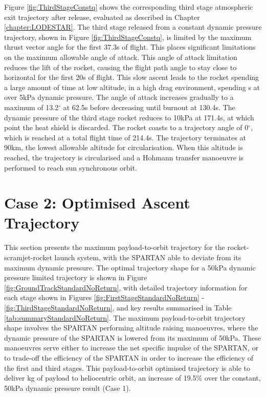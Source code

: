Figure \ref{fig:ThirdStageConstq} shows the corresponding third stage atmospheric exit trajectory after release, evaluated as described in Chapter \ref{chapter:LODESTAR}. The third stage released from a constant dynamic pressure trajectory, shown in Figure \ref{fig:ThirdStageConstq}, is limited by the maximum thrust vector angle for the first 37.3s of flight. This places significant limitations on the maximum allowable angle of attack. This angle of attack limitation reduces the lift of the rocket, causing the flight path angle to stay close to horizontal for the first 20s of flight. This slow ascent leads to the rocket spending a large amount of time at low altitude, in a high drag environment, spending \thirdqOverFiveConstqNoReturn s at over 5kPa dynamic pressure. The angle of attack increases gradually to a maximum of 13.2$^\circ$ at 62.5s before decreasing until burnout at 130.4s. The dynamic pressure of the third stage rocket reduces to 10kPa at 171.4s, at which point the heat shield is discarded. The rocket coasts to a trajectory angle of 0$^\circ$, which is reached at a total flight time of 214.4s. The trajectory terminates at 90km, the lowest allowable altitude for circularisation. 
When this altitude is reached, the trajectory is circularised and a Hohmann transfer manoeuvre is performed to reach sun synchronous orbit.






\section{Case 2: Optimised Ascent Trajectory}\label{sec:optimisednoreturn}


This section presents the maximum payload-to-orbit trajectory for the rocket-scramjet-rocket launch system, with the SPARTAN able to deviate from its maximum dynamic pressure. 
The optimal trajectory shape for a 50kPa dynamic pressure limited trajectory is shown in Figure \ref{fig:GroundTrackStandardNoReturn}, with detailed trajectory information for each stage shown in Figures \ref{fig:FirstStageStandardNoReturn} - \ref{fig:ThirdStageStandardNoReturn}, and key results summarised in Table \ref{tab:summaryStandardNoReturn}. The maximum payload-to-orbit trajectory shape involves the SPARTAN performing altitude raising manoeuvres, where the dynamic pressure of the SPARTAN is lowered from its maximum of 50kPa. These manoeuvres serve either to increase the net specific impulse of the SPARTAN, or to trade-off the efficiency of the SPARTAN in order to increase the efficiency of the first and third stages. 
This payload-to-orbit optimised trajectory is able to deliver \PayloadToOrbitStandardNoReturn kg of payload to heliocentric orbit, an increase of 19.5\% over the constant, 50kPa dynamic pressure result (Case 1).

